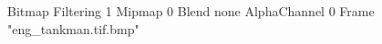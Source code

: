 {Bitmap
	{Filtering 1}
	{Mipmap 0}
	{Blend none}
	{AlphaChannel 0}
	{Frame "eng_tankman.tif.bmp"}
}
